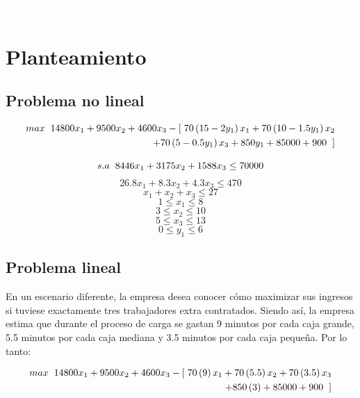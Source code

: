 \documentclass[11pt]{article}
\begin{document}
\newpage
\begin{itemize}
    \item[\textcolor{white}{ESPACIO}] \textcolor{white}{ESPACIO}
\end{itemize}

\section {Planteamiento}
\subsection{Problema no lineal}
\begin{eqnarray}
    max \hspace{0.2cm} 14800x_{1} + 9500x_2 + 4600x_3 - [\hspace{0.1cm}70\left(15 - 2y_1 \right)x_1 + 70\left(10 - 1.5y_1 \right)x_2   \nonumber\\ 
    + 70\left(5 - 0.5y_1 \right)x_3 + 850y_1 + 85000 + 900\hspace{0.2cm}]  \nonumber
\end{eqnarray}

\[s.a \hspace{0.2cm}8446x_1 + 3175x_2 + 1588x_3 \leq 70000\]
\[26.8x_1 + 8.3x_2 + 4.3x_3 \leq 470\]
\[x_1 + x_2 + x_3 \leq 27\]
\[1 \leq x_1 \leq 8\]
\[3 \leq x_2 \leq 10\]
\[5 \leq x_3 \leq 13\]
\[ 0 \leq y_1 \leq 6\] 
\justify

\subsection{Problema lineal}

En un escenario diferente, la empresa desea conocer cómo maximizar sus ingresos si tuviese exactamente tres trabajadores extra contratados. Siendo así, la empresa estima que durante el proceso de carga se gastan 9 minutos por cada caja grande, 5.5 minutos por cada caja mediana y 3.5 minutos por cada caja pequeña. Por lo tanto:


\begin{eqnarray}
    max \hspace{0.2cm} 14800x_{1} + 9500x_2 + 4600x_3 - [\hspace{0.1cm}70\left(9 \right)x_1 + 70\left(5.5 \right)x_2  + 70\left(3.5\right)x_3  \nonumber\\ 
    + 850\left(3 \right) + 85000 + 900\hspace{0.2cm}]  \nonumber
\end{eqnarray}
\end{document}
